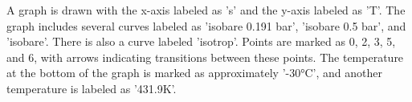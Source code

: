 A graph is drawn with the x-axis labeled as 's' and the y-axis labeled as 'T'. The graph includes several curves labeled as 'isobare 0.191 bar', 'isobare 0.5 bar', and 'isobare'. There is also a curve labeled 'isotrop'. Points are marked as 0, 2, 3, 5, and 6, with arrows indicating transitions between these points. The temperature at the bottom of the graph is marked as approximately '-30°C', and another temperature is labeled as '431.9K'.